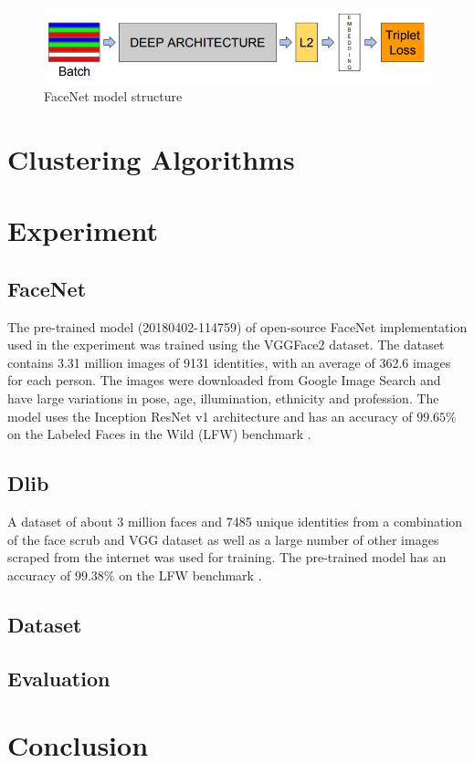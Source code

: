 \documentclass[12pt,english]{article}
\begin{document}
\begin{figure}[!tbp]
 \centering
    \includegraphics[width=\textwidth]{figures/facenet_model_archi.png}
    \caption{FaceNet model structure \cite{schroff}}
	\label{fig:facemodel}
\end{figure}

\section{Clustering Algorithms}

\section{Experiment}

\subsection{FaceNet}

The pre-trained model (20180402-114759) of open-source FaceNet implementation \cite{sandberg} used in the experiment was trained using the VGGFace2 dataset. The dataset contains 3.31 million images of 9131 identities, with an average of 362.6 images for each person. The images were downloaded from Google Image Search and have large variations in pose, age, illumination, ethnicity and profession. The model uses the Inception ResNet v1 architecture and has an accuracy of $99.65\%$ on the Labeled Faces in the Wild (LFW) benchmark \cite{sandberg}.

\subsection{Dlib}

A dataset of about 3 million faces and 7485 unique identities from a combination of the face scrub and VGG dataset as well as a large number of other images scraped from the internet was used for training. The pre-trained model has an accuracy of $99.38\%$ on the LFW benchmark \cite{king2017}.

\subsection{Dataset}


\subsection{Evaluation}


\section{Conclusion}

\nocite{*}

\printbibliography
\end{document}
